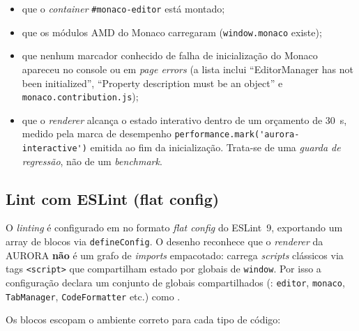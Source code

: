 \begin{itemize}[nosep]
  \item que o \emph{container} \lstinline|#monaco-editor| está montado;
  \item que os módulos AMD do Monaco carregaram (\lstinline|window.monaco| existe);
  \item que nenhum marcador conhecido de falha de inicialização do Monaco
        apareceu no console ou em \emph{page errors} (a lista
         inclui
        \enquote{EditorManager has not been initialized},
        \enquote{Property description must be an object} e
        \lstinline|monaco.contribution.js|);
  \item que o \emph{renderer} alcança o estado interativo dentro de um orçamento
        de 30~s, medido pela marca de desempenho
        \lstinline|performance.mark('aurora-interactive')| emitida ao fim da
        inicialização. Trata-se de uma \emph{guarda de regressão}, não de um
        \emph{benchmark}.
\end{itemize}

\subsection{Lint com ESLint (flat config)}
\label{sub:18-eslint}

O \emph{linting} é configurado em  no formato
\emph{flat config} do ESLint~9, exportando um array de blocos via
\lstinline|defineConfig|. O desenho reconhece que o \emph{renderer} da AURORA
\textbf{não} é um grafo de \emph{imports} empacotado:  carrega
\emph{scripts} clássicos via tags \lstinline|<script>| que compartilham estado
por globais de \lstinline|window|. Por isso a configuração declara um conjunto de
globais compartilhados (: \lstinline|editor|,
\lstinline|monaco|, \lstinline|TabManager|, \lstinline|CodeFormatter| etc.) como
.

Os blocos escopam o ambiente correto para cada tipo de código:

